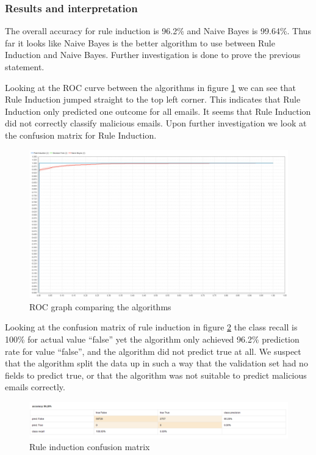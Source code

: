 \documentclass[hidelinks,english]{article}
\begin{document}
    	\subsubsection{Results and interpretation}
        The overall accuracy for rule induction is 96.2\% and Naive Bayes is 99.64\%. Thus far it looks like Naive Bayes is the better algorithm to use between Rule Induction and Naive Bayes. Further investigation is done to prove the previous statement.
        
        Looking at the ROC curve between the algorithms in figure \ref{fig:roc} we can see that Rule Induction jumped straight to the top left corner. This indicates that Rule Induction only predicted one outcome for all emails. It seems that Rule Induction did not correctly classify malicious emails. Upon further investigation we look at the confusion matrix for Rule Induction.
        \begin{figure}[h]
        	\centering
            \includegraphics[width=\textwidth]{ROC.PNG}
            \caption{ROC graph comparing the algorithms}
            \label{fig:roc}
        \end{figure}
        
        Looking at the confusion matrix of rule induction in figure \ref{fig:rule-induction} the class recall is 100\% for actual value ``false'' yet the algorithm only achieved 96.2\% prediction rate for value ``false'', and the algorithm did not predict true at all. We suspect that the algorithm split the data up in such a way that the validation set had no fields to predict true, or that the algorithm was not suitable to predict malicious emails correctly.
        \begin{figure}[h]
        	\centering
            \includegraphics[width=\textwidth]{Rule-induction-cunfusion-matrix.PNG}
            \caption{Rule induction confusion matrix}
            \label{fig:rule-induction}
        \end{figure}
        
\end{document}
